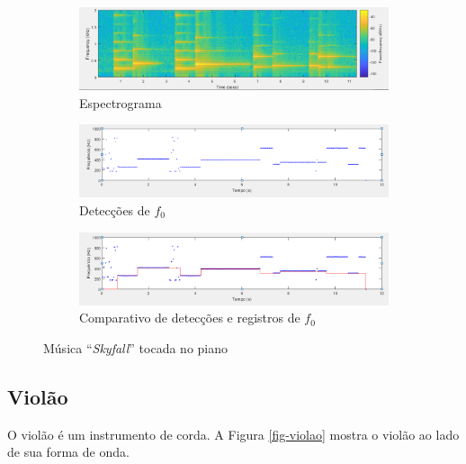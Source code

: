 \begin{figure}
	
	\begin{subfigure}{1\textwidth}
		\includegraphics[width=\linewidth]{pasta1_figuras/piano-skyfall-2.png}
		\caption{Espectrograma}
		\label{fig-piano-skyfall-2}
	\end{subfigure}
	
	\begin{subfigure}{1\textwidth}
		\includegraphics[width=\linewidth]{pasta1_figuras/piano-skyfall-3.png}
		\caption{Detecções de $f_0$}
		\label{fig-piano-skyfall-3}
	\end{subfigure}
	
	\begin{subfigure}{1\textwidth}
		\includegraphics[width=\linewidth]{pasta1_figuras/piano-skyfall-4.png}
		\caption{Comparativo de detecções e registros de $f_0$}
		\label{fig-piano-skyfall-4}
	\end{subfigure}
	\caption{Música ``\textit{Skyfall}'' tocada no piano}
\end{figure}



\subsection{Violão}

O violão é um instrumento de corda. A Figura \ref{fig-violao} mostra o violão ao lado de sua forma de onda.

